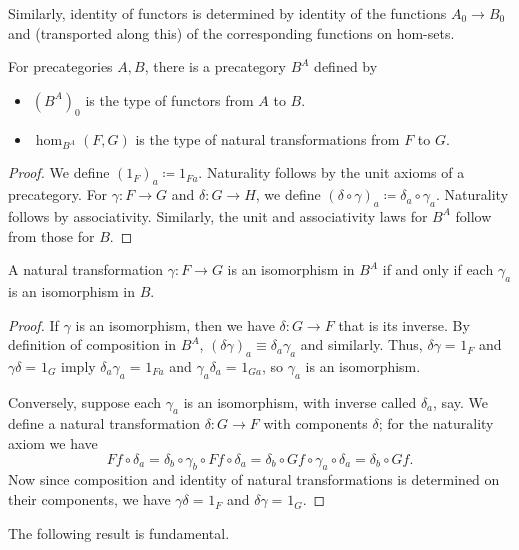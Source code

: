 \documentclass{amsart}
\newcommand{\jdeq}{\equiv}      %
\newcommand{\defeq}{\coloneqq}  %
\newcommand{\id}[3][]{\ensuremath{#2 =_{#1} #3}\xspace}
\theoremstyle{definition}
\theoremstyle{remark}
\numberwithin{equation}{section}
\begin{document}
Similarly, identity of functors is determined by identity of the functions $A_0\to B_0$ and (transported along this) of the corresponding functions on hom-sets.

\begin{defn}\label{ct:functor-precat}
  For precategories $A,B$, there is a precategory $B^A$ defined by
  \begin{itemize}
  \item $(B^A)_0$ is the type of functors from $A$ to $B$.
  \item $\hom_{B^A}(F,G)$ is the type of natural transformations from $F$ to $G$.
  \end{itemize}
\end{defn}
\begin{proof}
  We define $(1_F)_a\defeq 1_{Fa}$.
  Naturality follows by the unit axioms of a precategory.
  For $\gamma:F\to G$ and $\delta:G\to H$, we define $(\delta\circ\gamma)_a\defeq \delta_a\circ \gamma_a$.
  Naturality follows by associativity.
  Similarly, the unit and associativity laws for $B^A$ follow from those for $B$.
\end{proof}

\begin{lem}\label{ct:natiso}
  A natural transformation $\gamma:F\to G$ is an isomorphism in $B^A$ if and only if each $\gamma_a$ is an isomorphism in $B$.
\end{lem}
\begin{proof}
  If $\gamma$ is an isomorphism, then we have $\delta:G\to F$ that is its inverse.
  By definition of composition in $B^A$, $(\delta\gamma)_a\jdeq \delta_a\gamma_a$ and similarly.
  Thus, $\id{\delta\gamma}{1_F}$ and $\id{\gamma\delta}{1_G}$ imply $\id{\delta_a\gamma_a}{1_{Fa}}$ and $\id{\gamma_a\delta_a}{1_{Ga}}$, so $\gamma_a$ is an isomorphism.

  Conversely, suppose each $\gamma_a$ is an isomorphism, with inverse called $\delta_a$, say.
We define a natural transformation $\delta:G\to F$ with components $\delta$; for the naturality axiom we have
  \[ Ff\circ \delta_a = \delta_b\circ \gamma_b\circ Ff \circ \delta_a = \delta_b\circ Gf\circ \gamma_a\circ \delta_a = \delta_b\circ Gf. \]
  Now since composition and identity of natural transformations is determined on their components, we have $\id{\gamma\delta}{1_F}$ and $\id{\delta\gamma}{1_G}$.
\end{proof}

The following result is fundamental.
\end{document}
